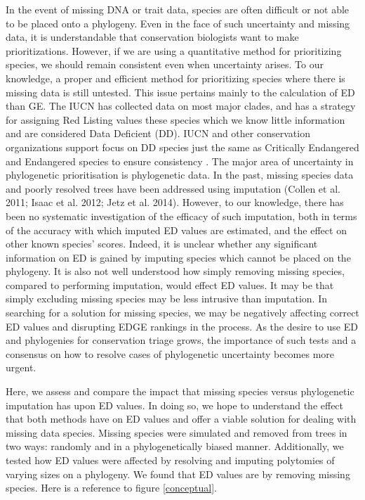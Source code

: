 \documentclass[12pt,english]{article}
\begin{document}
In the event of missing DNA or trait data, species are often difficult
or not able to be placed onto a phylogeny. Even in the face of such
uncertainty and missing data, it is understandable that conservation
biologists want to make prioritizations. However, if we are using a
quantitative method for prioritizing species, we should remain
consistent even when uncertainty arises. To our knowledge, a proper
and efficient method for prioritizing species where there is missing
data is still untested. This issue pertains mainly to the calculation
of ED than GE. The IUCN has collected data on most major clades, and
has a strategy for assigning Red Listing values these species which we
know little information and are considered Data Deficient (DD). IUCN
and other conservation organizations support focus on DD species just
the same as Critically Endangered and Endangered species to ensure
consistency \autocite{Rodrigues2006}. The major area of uncertainty in
phylogenetic prioritisation is phylogenetic data. In the past, missing
species data and poorly resolved trees have been addressed using
imputation (Collen et al. 2011; Isaac et al. 2012; Jetz et
al. 2014). However, to our knowledge, there has been no systematic
investigation of the efficacy of such imputation, both in terms of the
accuracy with which imputed ED values are estimated, and the effect on
other known species’ scores. Indeed, it is unclear whether any
significant information on ED is gained by imputing species which
cannot be placed on the phylogeny. It is also not well understood how
simply removing missing species, compared to performing imputation,
would effect ED values. It may be that simply excluding missing
species may be less intrusive than imputation. In searching for a
solution for missing species, we may be negatively affecting correct
ED values and disrupting EDGE rankings in the process. As the desire
to use ED and phylogenies for conservation triage grows, the
importance of such tests and a consensus on how to resolve cases of
phylogenetic uncertainty becomes more urgent.

Here, we assess and compare the impact that missing species versus
phylogenetic imputation has upon ED values. In doing so, we hope to
understand the effect that both methods have on ED values and offer a
viable solution for dealing with missing data species. Missing species
were simulated and removed from trees in two ways: randomly and in a
phylogenetically biased manner. Additionally, we tested how ED values
were affected by resolving and imputing polytomies of varying sizes on
a phylogeny. We found that ED values are by removing missing
species. Here is a reference to figure \ref{conceptual}.
\end{document}
